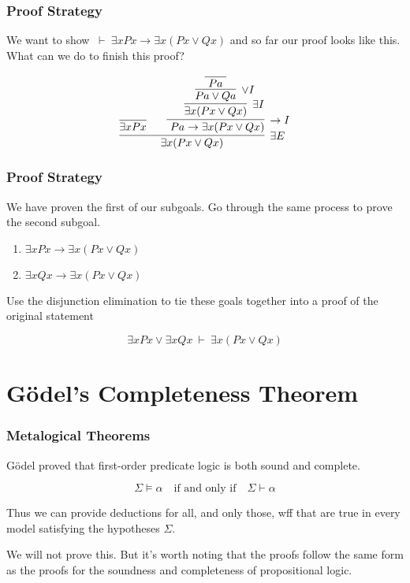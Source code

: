 \documentclass{beamer}
\theoremstyle{indentDefn} \newtheorem{defn}[]{Definition}
\begin{document}
\begin{frame}
	\frametitle{Proof Strategy}
	
		We want to show $ \ \vdash \ \exists x Px \rightarrow \exists x (Px \lor Qx)$ and so far our proof looks like this. What can we do to finish this proof?
	
	$$ \infer[\exists E]{\exists x (Px \lor Qx)}{\infer[]{\exists x Px}{} \ & \infer[\rightarrow I]{\ Pa \rightarrow \exists x (Px \lor Qx)}{\infer[\exists I]{\exists x (Px \lor Qx)}
			{\infer[\lor I]{Pa \lor Qa}
				{\infer[]{ \ Pa \ }{}}}}} $$
	
	\vspace{3cm}		
	
\end{frame}

\begin{frame}
	\frametitle{Proof Strategy}
	
	We have proven the first of our subgoals. Go through the same process to prove the second subgoal. 
	
	\begin{center}
		\begin{enumerate}
			\item $\exists x Px \rightarrow \exists x (Px \lor Qx)$
			\item $\exists x Qx \rightarrow \exists x (Px \lor Qx)$		
		\end{enumerate}
	\end{center}	
	
	Use the disjunction elimination to tie these goals together into a proof of the original statement
	
	$$\exists x Px \lor \exists x Qx \ \vdash \ \exists x (Px \lor Qx)$$
	
	\vspace{2cm}
	
	
\end{frame}

\section{G\"{o}del's Completeness Theorem}

\begin{frame}
	\frametitle{Metalogical Theorems}
	
	G\"{o}del proved that first-order predicate logic is both sound and complete. 
	
	$$ \Sigma \vDash \alpha \quad \text{if and only if} \quad \Sigma \vdash \alpha$$
	
	Thus we can provide deductions for all, and only those, wff that are true in every model satisfying the hypotheses $\Sigma$. 
	
	\vspace{0.5cm}
	
	We will not prove this. But it's worth noting that the proofs follow the same form as the proofs for the soundness and completeness of propositional logic. 
	
\end{frame}
\end{document}
